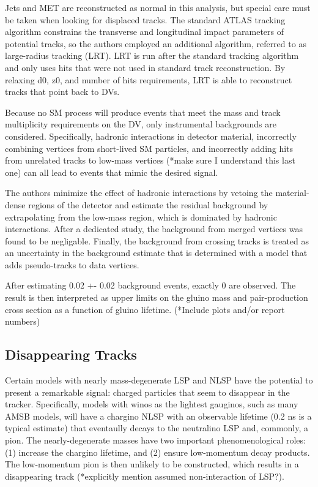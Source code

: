 \documentclass[12pt]{article}
\begin{document}
    Jets and MET are reconstructed as normal in this analysis, but special care must be taken when looking for displaced tracks. The standard ATLAS tracking algorithm constrains the transverse and longitudinal impact parameters of potential tracks, so the authors employed an additional algorithm, referred to as large-radius tracking (LRT). LRT is run after the standard tracking algorithm and only uses hits that were not used in standard track reconstruction. By relaxing d0, z0, and number of hits requirements, LRT is able to reconstruct tracks that point back to DVs.
    
    Because no SM process will produce events that meet the mass and track multiplicity requirements on the DV, only instrumental backgrounds are considered. Specifically, hadronic interactions in detector material, incorrectly combining vertices from short-lived SM particles, and incorrectly adding hits from unrelated tracks to low-mass vertices (*make sure I understand this last one) can all lead to events that mimic the desired signal.

    The authors minimize the effect of hadronic interactions by vetoing the material-dense regions of the detector and estimate the residual background by extrapolating from the low-mass region, which is dominated by hadronic interactions. After a dedicated study, the background from merged vertices was found to be negligable. Finally, the background from crossing tracks is treated as an uncertainty in the background estimate that is determined with a model that adds pseudo-tracks to data vertices. 

    After estimating 0.02 +- 0.02 background events, exactly 0 are observed. The result is then interpreted as upper limits on the gluino mass and pair-production cross section as a function of gluino lifetime. (*Include plots and/or report numbers)

\subsection{Disappearing Tracks}
    Certain models with nearly mass-degenerate LSP and NLSP have the potential to present a remarkable signal: charged particles that seem to disappear in the tracker. Specifically, models with winos as the lightest gauginos, such as many AMSB models, will have a chargino NLSP with an observable lifetime (0.2 ns is a typical estimate) that eventaully decays to the neutralino LSP and, commonly, a pion. The nearly-degenerate masses have two important phenomenological roles: (1) increase the chargino lifetime, and (2) ensure low-momentum decay products. The low-momentum pion is then unlikely to be constructed, which results in a disappearing track (*explicitly mention assumed non-interaction of LSP?).
\end{document}
